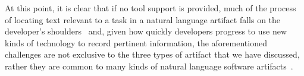 At this point, it is clear that if no tool support is provided, much of the process of locating text 
relevant to a task in a natural language artifact falls on the developer's shoulders~\cite{gonccalves2011, Ko2006a, Bystrom1995} and, given how quickly developers progress to use new kinds of technology to
record pertinent information, the aforementioned challenges are not exclusive 
to the three types of artifact that we have discussed, rather 
they are common to many kinds of natural language software artifacts~\cite{Li2013, Starke2009}.




 
 
 
 
 
 

 
 

    

